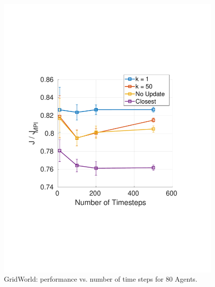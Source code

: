 \documentclass[journal]{IEEEtran}
\begin{document}
\begin{figure}
    \centering
    \includegraphics[scale = 0.5, trim={2.5cm 6.5cm 3cm 7cm}, clip]{gridworld_performance_nt_v3.pdf}
    \caption{GridWorld: performance vs. number of time steps for 80 Agents.}
    \label{fig:dist_performance_nt}
\end{figure}
\end{document}
